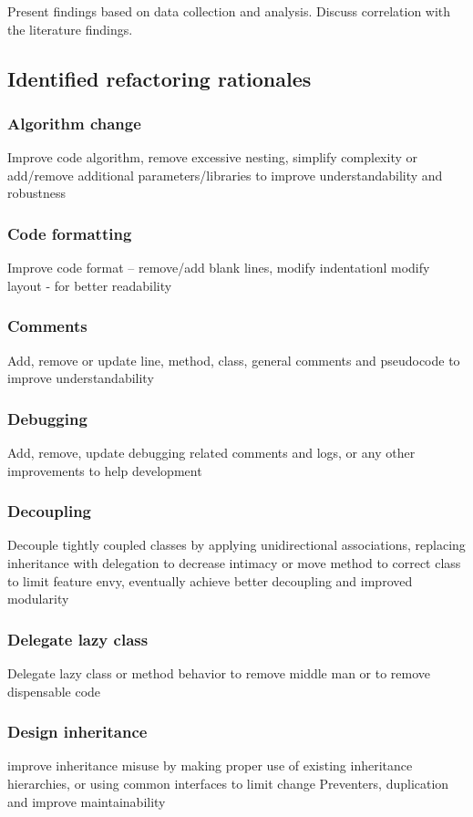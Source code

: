 Present findings based on data collection and analysis. Discuss correlation with the literature findings.
\subsection{Identified refactoring rationales}
\subsubsection*{Algorithm change}
Improve code algorithm, remove excessive nesting, simplify complexity or add/remove additional parameters/libraries to improve understandability and robustness

\subsubsection*{Code formatting}
Improve code format – remove/add blank lines, modify indentationl modify layout -  for better readability

\subsubsection*{Comments}
Add, remove or update line, method, class, general comments and pseudocode to improve understandability

\subsubsection*{Debugging}
Add, remove, update debugging related comments and logs, or any other improvements to help development

\subsubsection*{Decoupling}
Decouple tightly coupled classes by applying unidirectional associations, replacing inheritance with delegation to decrease intimacy or move method to correct class to limit feature envy, eventually achieve better decoupling and improved modularity

\subsubsection*{Delegate lazy class}
Delegate lazy class or method behavior to remove middle man or to remove dispensable code

\subsubsection*{Design inheritance}
improve inheritance misuse by making proper use of existing inheritance hierarchies, or using common interfaces to limit change Preventers, duplication and improve maintainability 

